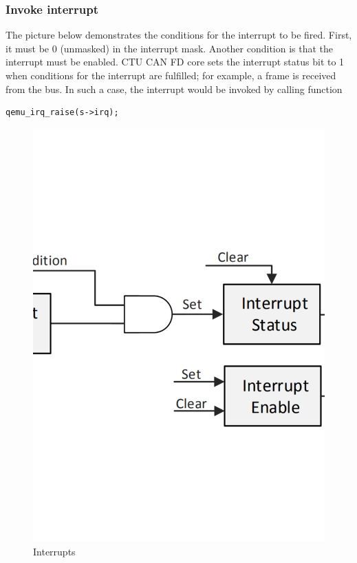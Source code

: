 \documentclass{ctuthesis}
\begin{document}
  \subsubsection{Invoke interrupt}
  The picture below demonstrates the conditions for the interrupt to be fired. First, it must be 0 (unmasked) in the interrupt mask. Another condition is that the interrupt must be enabled. CTU CAN FD core sets the interrupt status bit to 1 when conditions for the interrupt are fulfilled; for example, a frame is received from the bus. In such a case, the interrupt would be invoked by calling function 
  \begin{verbatim}qemu_irq_raise(s->irq);\end{verbatim}
  \begin{figure}[H]
  \includegraphics[width=1\textwidth]{progdum-interrupts.pdf}
  \caption{Interrupts \cite{progdum}}
  \end{figure}
 
\end{document}
